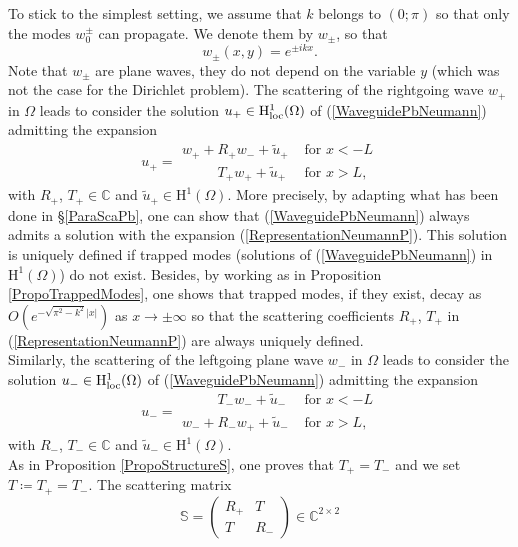 \documentclass[11pt,a4paper]{report}
\newcommand{\Om}{\Omega}
\newcommand{\mrm}[1]{\mathrm{#1}}
\newcommand{\Cplx}{\mathbb{C}}
\newcommand{\mH}{\mrm{H}}
\newcommand{\loc}{\mbox{\scriptsize loc}}
\begin{document}
To stick to the simplest setting, we assume that $k$ belongs to $(0;\pi)$ so that only the modes $w^\pm_0$ can propagate. We denote them by $w_\pm$, so that
\begin{equation}\label{Defwpm}
w_\pm(x,y)=e^{\pm i k x}.
\end{equation}
Note that $w_\pm$ are plane waves, they do not depend on the variable $y$ (which was not the case for the Dirichlet problem). The scattering of the rightgoing wave $w_+$ in $\Om$ leads to consider the solution $u_+\in\mH^1_{\loc}(\Om)$ of (\ref{WaveguidePbNeumann}) admitting the expansion
\begin{equation}\label{RepresentationNeumannP}
u_+=\begin{array}{|ll}
w_++R_+w_-+\tilde{u}_+ & \mbox{ for }x < - L \\[3pt]
\phantom{w_+mi}T_+w_++\tilde{u}_+ & \mbox{ for }x>L,
\end{array}
\end{equation}
with $R_+$, $T_+\in\Cplx$ and $\tilde{u}_+\in\mH^1(\Om)$. More precisely, by adapting what has been done in \S\ref{ParaScaPb}, one can show that (\ref{WaveguidePbNeumann}) always admits a solution with the expansion (\ref{RepresentationNeumannP}). This solution is uniquely defined if trapped modes (solutions of (\ref{WaveguidePbNeumann}) in $\mH^1(\Om)$) do not exist. Besides, by working as in Proposition \ref{PropoTrappedModes}, one shows that trapped modes, if they exist, decay as $O(e^{-\sqrt{\pi^2-k^2}|x|})$ as $x\to\pm\infty$ so that the scattering coefficients $R_+$, $T_+$ in (\ref{RepresentationNeumannP}) are always uniquely defined.\\
\newline
Similarly, the scattering of the leftgoing plane wave $w_-$ in $\Om$ leads to consider the solution $u_-\in\mH^1_{\loc}(\Om)$ of (\ref{WaveguidePbNeumann}) admitting the expansion
\begin{equation}\label{RepresentationNeumannM}
u_-=\begin{array}{|ll}
\phantom{w_+mi}T_-w_-+\tilde{u}_- & \mbox{ for }x < - L \\[3pt]
w_-+R_-w_++\tilde{u}_- & \mbox{ for }x>L,
\end{array}
\end{equation}
with $R_-$, $T_-\in\Cplx$ and $\tilde{u}_-\in\mH^1(\Om)$.\\
\newline
As in Proposition \ref{PropoStructureS}, one proves that $T_+=T_-$ and we set $T\coloneqq T_+=T_-$. The scattering matrix 
\begin{equation}\label{DefScaMatN}
\mathbb{S}=\left( 
\begin{array}{cc}
R_+ & T \\[2pt]
T & R_- 
\end{array}
\right)\in\Cplx^{2\times2}
\end{equation}
\end{document}
